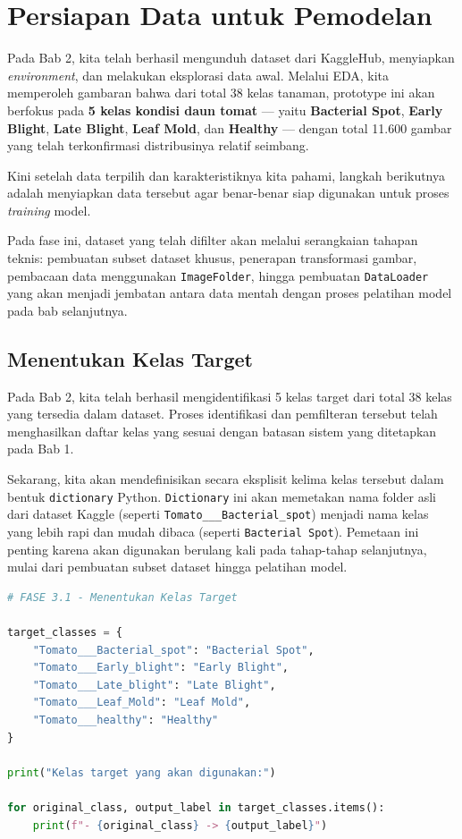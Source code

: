 \chapter{Persiapan Data untuk Pemodelan}

Pada Bab 2, kita telah berhasil mengunduh dataset dari KaggleHub, menyiapkan \textit{environment}, dan melakukan eksplorasi data awal. Melalui EDA, kita memperoleh gambaran bahwa dari total 38 kelas tanaman, prototype ini akan berfokus pada \textbf{5 kelas kondisi daun tomat} --- yaitu \textbf{Bacterial Spot}, \textbf{Early Blight}, \textbf{Late Blight}, \textbf{Leaf Mold}, dan \textbf{Healthy} --- dengan total 11.600 gambar yang telah terkonfirmasi distribusinya relatif seimbang.

Kini setelah data terpilih dan karakteristiknya kita pahami, langkah berikutnya adalah menyiapkan data tersebut agar benar-benar siap digunakan untuk proses \textit{training} model.

Pada fase ini, dataset yang telah difilter akan melalui serangkaian tahapan teknis: pembuatan subset dataset khusus, penerapan transformasi gambar, pembacaan data menggunakan \texttt{ImageFolder}, hingga pembuatan \texttt{DataLoader} yang akan menjadi jembatan antara data mentah dengan proses pelatihan model pada bab selanjutnya.

\section{Menentukan Kelas Target}

Pada Bab 2, kita telah berhasil mengidentifikasi 5 kelas target dari total 38 kelas yang tersedia dalam dataset. Proses identifikasi dan pemfilteran tersebut telah menghasilkan daftar kelas yang sesuai dengan batasan sistem yang ditetapkan pada Bab 1.

Sekarang, kita akan mendefinisikan secara eksplisit kelima kelas tersebut dalam bentuk \texttt{dictionary} Python. \texttt{Dictionary} ini akan memetakan nama folder asli dari dataset Kaggle (seperti \texttt{Tomato\_\_\_\allowbreak Bacterial\_spot}) menjadi nama kelas yang lebih rapi dan mudah dibaca (seperti \texttt{Bacterial Spot}). Pemetaan ini penting karena akan digunakan berulang kali pada tahap-tahap selanjutnya, mulai dari pembuatan subset dataset hingga pelatihan model.

\begin{lstlisting}[language=Python, caption=Menentukan kelas target]
# FASE 3.1 - Menentukan Kelas Target

target_classes = {
    "Tomato___Bacterial_spot": "Bacterial Spot",
    "Tomato___Early_blight": "Early Blight",
    "Tomato___Late_blight": "Late Blight",
    "Tomato___Leaf_Mold": "Leaf Mold",
    "Tomato___healthy": "Healthy"
}

print("Kelas target yang akan digunakan:")

for original_class, output_label in target_classes.items():
    print(f"- {original_class} -> {output_label}")
\end{lstlisting}

